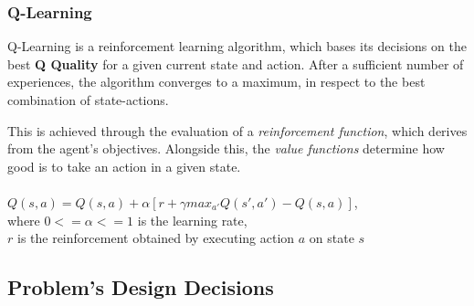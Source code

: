 \documentclass[10pt,a4paper]{article}
\begin{document}
\subsubsection{Q-Learning}
	Q-Learning is a reinforcement learning algorithm, which bases its decisions on the best \textbf{Q Quality} for a given current state and action. After a sufficient number of experiences, the algorithm converges to a maximum, in respect to the best combination of state-actions. \cite{acetatos2014}
    
    This is achieved through the evaluation of a \textit{reinforcement function}, which derives from the agent's objectives. Alongside this, the \textit{value functions} determine how good is to take an action in a given state.
\\
\\
    $Q(s, a) = Q(s, a) + \alpha [r + \gamma max_{a'} Q(s', a') - Q(s, a)]$, \\
    where $0 <= \alpha <= 1$ is the learning rate, \\
    $r$ is the reinforcement obtained by executing action $a$ on state $s$ \\
    


\subsection{Problem's Design Decisions}
\end{document}
